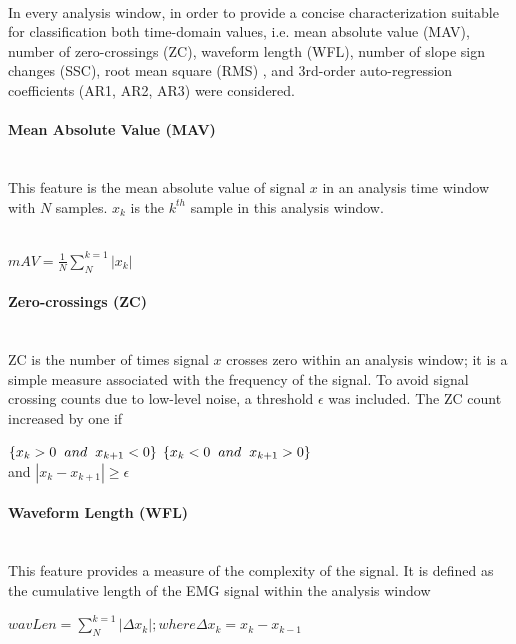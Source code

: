 \documentclass[12pt]{article}
\begin{document}
\paragraph{}
In every analysis window, in order to provide a concise characterization suitable for classification both time-domain values, i.e. mean absolute value (MAV),
number of zero-crossings (ZC), waveform length (WFL), number of slope sign changes (SSC), root mean square (RMS) , and 3rd-order auto-regression coefficients (AR1,
AR2, AR3) were considered.

\paragraph{Mean Absolute Value (MAV)}\cite{Dennis Tkach}\\
This feature is the mean absolute value of signal $x$ in an analysis time window with $N$ samples. $x_k$ is the $k^{th}$ sample in this analysis window.\\\\
\begin{center}
$mAV = \frac{1}{N} \sum_{N}^{k=1}| x_k |$
\end{center}

\paragraph{Zero-crossings (ZC)}\cite{Dennis Tkach}\\
ZC is the number of times signal $x$ crosses zero within an analysis window; it is a simple measure associated with the frequency of the signal. To avoid signal crossing counts due to low-level noise, a threshold $\epsilon$ was included. The ZC count increased by one if\\
\begin{center}
$\{x_k > 0 \hspace{0.2cm} and \hspace{0.2cm} x_{k+1} < 0\}$ 
$\{x_k < 0 \hspace{0.2cm} and \hspace{0.2cm} x_{k+1} > 0\}$\\
and $|x_k - x_{k+1}| \geq \epsilon$
\end{center}

\paragraph{Waveform Length (WFL)}\cite{Dennis Tkach}\\
This feature provides a measure of the complexity of the signal. It is defined as the cumulative length of the EMG signal within the analysis window
\begin{center}
$wavLen=\sum_{N}^{k=1}|\Delta x_k|;where \Delta x_k = x_k - x_{k-1}$
\end{center}
\end{document}
